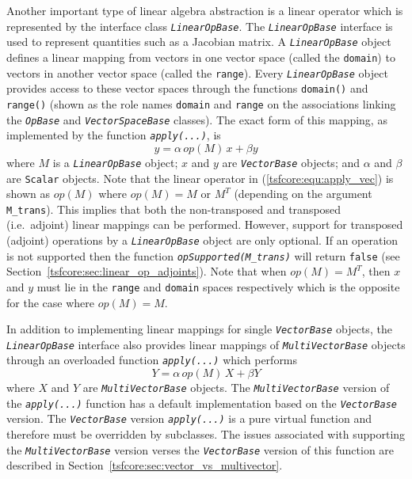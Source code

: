 \documentclass[pdf,ps2pdf,11pt]{SANDreport}
\begin{document}
Another important type of linear algebra abstraction is a linear
operator which is represented by the interface class
{}\texttt{\textit{Linear\-Op\-Base}}.  The {}\texttt{\textit{Linear\-Op\-Base}}
interface is used to represent quantities such as a Jacobian matrix. A
{}\texttt{\textit{Linear\-Op\-Base}} object defines a linear mapping from
vectors in one vector space (called the {}\texttt{domain}) to vectors
in another vector space (called the {}\texttt{range}).  Every
{}\texttt{\textit{Linear\-Op\-Base}} object provides access to these vector
spaces through the functions {}\texttt{domain()} and {}\texttt{range()}
(shown as the role names {}\texttt{domain} and {}\texttt{range} on the
associations linking the {}\texttt{\textit{OpBase}} and
{}\texttt{\textit{Vector\-Space\-Base}} classes).  The exact form of this
mapping, as implemented by the function
{}\texttt{\textit{apply(\-...)}}, is
%
\begin{equation}
y = \alpha \, op(M) \, x + \beta y
\label{tsfcore:equ:apply_vec}
\end{equation}
%
where $M$ is a {}\texttt{\textit{Linear\-Op\-Base}} object; $x$ and $y$ are
{}\texttt{\textit{Vector\-Base}} objects; and $\alpha$ and $\beta$ are
{}\texttt{Scalar} objects.  Note that the linear operator in
(\ref{tsfcore:equ:apply_vec}) is shown as $op(M)$ where $op(M) = M$ or $M^T$
(depending on the argument {}\texttt{M\_trans}). This implies that both the
non-transposed and transposed (i.e.~adjoint) linear mappings can be performed.
However, support for transposed (adjoint) operations by a
{}\texttt{\textit{Linear\-Op\-Base}} object are only optional.  If an
operation is not supported then the function
{}\texttt{\textit{opSupported(M\_trans)}} will return {}\texttt{false} (see
Section~\ref{tsfcore:sec:linear_op_adjoints}).  Note that when $op(M) = M^T$,
then $x$ and $y$ must lie in the {}\texttt{range} and {}\texttt{domain} spaces
respectively which is the opposite for the case where $op(M) = M$.

In addition to implementing linear mappings for single
{}\texttt{\textit{Vector\-Base}} objects, the {}\texttt{\textit{Linear\-Op\-Base}}
interface also provides linear mappings of
{}\texttt{\textit{Multi\-Vector\-Base}} objects through an overloaded function
{}\texttt{\textit{apply(\-...)}} which performs
%
\begin{equation}
Y = \alpha \, op(M) \, X + \beta Y
\label{tsfcore:equ:apply_multi_vec}
\end{equation}
%
where $X$ and $Y$ are {}\texttt{\textit{Multi\-Vector\-Base}} objects.  The
{}\texttt{\textit{Multi\-Vector\-Base}} version of the
{}\texttt{\textit{apply(\-...)}} function has a default implementation based
on the {}\texttt{\textit{Vector\-Base}} version.  The
{}\texttt{\textit{Vector\-Base}} version {}\texttt{\textit{apply(\-...)}}  is
a pure virtual function and therefore must be overridden by subclasses.  The
issues associated with supporting the {}\texttt{\textit{Multi\-Vector\-Base}}
version verses the {}\texttt{\textit{Vector\-Base}} version of this function
are described in Section~\ref{tsfcore:sec:vector_vs_multivector}.
\end{document}
